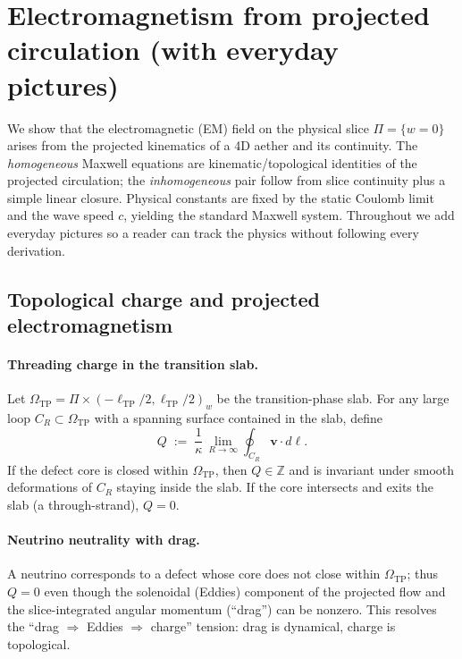 \section{Electromagnetism from projected circulation (with everyday pictures)}
\label{sec:EM_projection}

We show that the electromagnetic (EM) field on the physical slice $\Pi=\{w=0\}$ arises from the projected kinematics of a 4D aether and its continuity. The \emph{homogeneous} Maxwell equations are kinematic/topological identities of the projected circulation; the \emph{inhomogeneous} pair follow from slice continuity plus a simple linear closure. Physical constants are fixed by the static Coulomb limit and the wave speed $c$, yielding the standard Maxwell system. Throughout we add everyday pictures so a reader can track the physics without following every derivation.

\subsection{Topological charge and projected electromagnetism}
\label{sec:projected-em:charge}

\paragraph{Threading charge in the transition slab.}
Let $\Omega_{\mathrm{TP}}=\Pi\times(-\ell_{\mathrm{TP}}/2,\ell_{\mathrm{TP}}/2)_w$ be the transition-phase slab.
For any large loop $C_R\subset\Omega_{\mathrm{TP}}$ with a spanning surface contained in the slab, define
\begin{equation}
\label{eq:Q-threading}
Q \;:=\; \frac{1}{\kappa}\,\lim_{R\to\infty}\oint_{C_R}\mathbf v\cdot d\boldsymbol\ell.
\end{equation}
If the defect core is closed within $\Omega_{\mathrm{TP}}$, then $Q\in\mathbb Z$ and is invariant under smooth deformations of $C_R$ staying inside the slab. If the core intersects and exits the slab (a through-strand), $Q=0$.

\paragraph{Neutrino neutrality with drag.}
A neutrino corresponds to a defect whose core does not close within $\Omega_{\mathrm{TP}}$; thus $Q=0$ even though the solenoidal (Eddies) component of the projected flow and the slice-integrated angular momentum (“drag”) can be nonzero. This resolves the “drag $\Rightarrow$ Eddies $\Rightarrow$ charge” tension: drag is dynamical, charge is topological.

